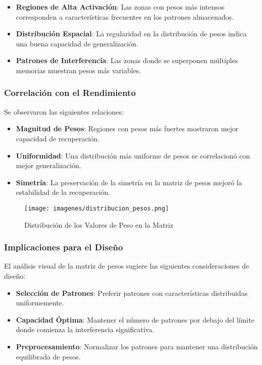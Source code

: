 \documentclass{article}
\begin{document}
\begin{itemize}
    \item \textbf{Regiones de Alta Activación}: Las zonas con pesos más intensos corresponden a características frecuentes en los patrones almacenados.
    \item \textbf{Distribución Espacial}: La regularidad en la distribución de pesos indica una buena capacidad de generalización.
    \item \textbf{Patrones de Interferencia}: Las zonas donde se superponen múltiples memorias muestran pesos más variables.
\end{itemize}

\subsubsection{Correlación con el Rendimiento}
Se observaron las siguientes relaciones:

\begin{itemize}
    \item \textbf{Magnitud de Pesos}: Regiones con pesos más fuertes mostraron mejor capacidad de recuperación.
    \item \textbf{Uniformidad}: Una distribución más uniforme de pesos se correlacionó con mejor generalización.
    \item \textbf{Simetría}: La preservación de la simetría en la matriz de pesos mejoró la estabilidad de la recuperación.
\end{itemize}

\begin{figure}[h]
    \centering
    \texttt{[image: imagenes/distribucion\_pesos.png]}
    \caption{Distribución de los Valores de Peso en la Matriz}
    \label{fig:distribucion_pesos}
\end{figure}

\subsubsection{Implicaciones para el Diseño}
El análisis visual de la matriz de pesos sugiere las siguientes consideraciones de diseño:

\begin{itemize}
    \item \textbf{Selección de Patrones}: Preferir patrones con características distribuidas uniformemente.
    \item \textbf{Capacidad Óptima}: Mantener el número de patrones por debajo del límite donde comienza la interferencia significativa.
    \item \textbf{Preprocesamiento}: Normalizar los patrones para mantener una distribución equilibrada de pesos.
\end{itemize}
\end{document}
